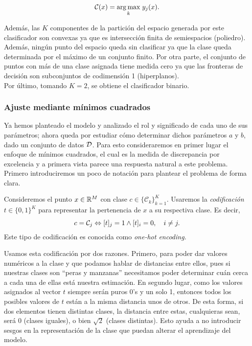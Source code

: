 \begin{equation}
	\mathcal{C}(x) = \underset{k}{\operatorname*{arg\,max}}\hspace{1mm} y_j(x).
\end{equation}

Además, las $K$ componentes de la partición del espacio generada por este clasificador son convexas ya que es intersección finita de semiespacios (poliedro). Además, ningún punto del espacio queda sin clasificar ya que la clase queda determinada por el máximo de un conjunto finito. Por otra parte, el conjunto de puntos con más de una clase asignada tiene medida cero ya que las fronteras de decisión son subconjuntos de codimensión 1 (hiperplanos).\\

Por último, tomando $K=2$, se obtiene el clasificador  binario.

\subsubsection{Ajuste mediante mínimos cuadrados}

Ya hemos planteado el modelo y analizado el rol  y significado de cada uno de sus parámetros; ahora queda por estudiar cómo determinar dichos parámetros $a$ y $b$, dado un conjunto de datos ${\mathcal D}$. Para esto consideraremos en primer lugar el enfoque de mínimos cuadrados, el cual es la medida de discrepancia  por  excelencia  y a primera vista  parece una respuesta natural a este problema. Primero  introduciremos un poco de notación para plantear el problema de forma clara.

Consideremos el  punto $x\in\mathbb{R}^M$ con clase $c\in\{\mathcal{C}_k\}_{k=1}^K$. Usaremos la \emph{codificación} $t \in\{0,1\}^K$ para representar la pertenencia de $x$ a su respectiva clase. Es decir, 
\begin{equation}
	c = {\mathcal C}_j \Leftrightarrow [t]_j=1 \wedge [t]_i=0, \quad i\neq j.
\end{equation}
Este tipo de codificación  es conocida como \emph{one-hot  encoding.}  

\begin{remark}
Usamos esta codificación por  dos razones. Primero, para poder dar valores numéricos a la clase y que  podamos hablar de distancias entre ellos, pues si nuestras clases son ``peras y manzanas'' necesitamos poder determinar cuán cerca a cada una de ellas está nuestra estimación. En segundo  lugar, como los valores asignados al vector $t$ siempre serán puros 0's y un solo 1, entonces  todos los posibles  valores de $t$ están a la misma distancia unos de otros. De esta forma, si dos elementos tienen distintas clases, la distancia entre estas, cualquieras sean, será 0 (clases iguales), o bien $\sqrt{2}$ (clases distintas). Esto ayuda a no introducir sesgos en la representación de la clase que puedan alterar el aprendizaje del modelo.  	
\end{remark}

